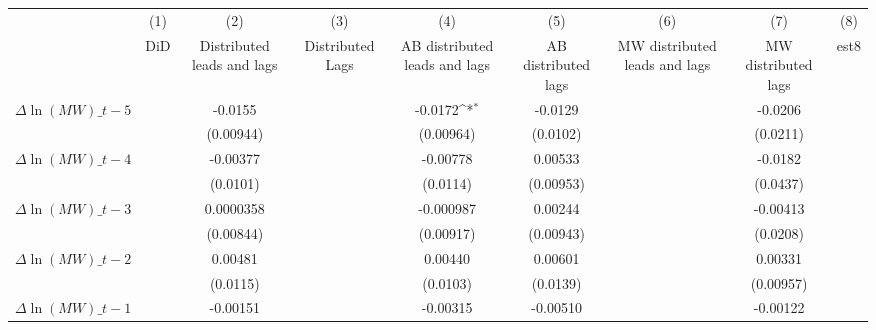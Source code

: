 {
\def\sym#1{\ifmmode^{#1}\else\(^{#1}\)\fi}
\begin{tabular}{l*{8}{c}}
\hline\hline
          &\multicolumn{1}{c}{(1)}&\multicolumn{1}{c}{(2)}&\multicolumn{1}{c}{(3)}&\multicolumn{1}{c}{(4)}&\multicolumn{1}{c}{(5)}&\multicolumn{1}{c}{(6)}&\multicolumn{1}{c}{(7)}&\multicolumn{1}{c}{(8)}\\
          &\multicolumn{1}{c}{DiD}&\multicolumn{1}{c}{Distributed leads and lags}&\multicolumn{1}{c}{Distributed Lags}&\multicolumn{1}{c}{AB distributed leads and lags}&\multicolumn{1}{c}{AB distributed lags}&\multicolumn{1}{c}{MW distributed leads and lags}&\multicolumn{1}{c}{MW distributed lags}&\multicolumn{1}{c}{est8}\\
\hline
$\Delta \ln(MW)\_{t-5}$&                  &  -0.0155         &                  &  -0.0172\sym{*}  &  -0.0129         &                  &  -0.0206         &                  \\
          &                  &(0.00944)         &                  &(0.00964)         & (0.0102)         &                  & (0.0211)         &                  \\
[1em]
$\Delta \ln(MW)\_{t-4}$&                  & -0.00377         &                  & -0.00778         &  0.00533         &                  &  -0.0182         &                  \\
          &                  & (0.0101)         &                  & (0.0114)         &(0.00953)         &                  & (0.0437)         &                  \\
[1em]
$\Delta \ln(MW)\_{t-3}$&                  &0.0000358         &                  &-0.000987         &  0.00244         &                  & -0.00413         &                  \\
          &                  &(0.00844)         &                  &(0.00917)         &(0.00943)         &                  & (0.0208)         &                  \\
[1em]
$\Delta \ln(MW)\_{t-2}$&                  &  0.00481         &                  &  0.00440         &  0.00601         &                  &  0.00331         &                  \\
          &                  & (0.0115)         &                  & (0.0103)         & (0.0139)         &                  &(0.00957)         &                  \\
[1em]
$\Delta \ln(MW)\_{t-1}$&                  & -0.00151         &                  & -0.00315         & -0.00510         &                  & -0.00122         &                  \\

\end{tabular}}
